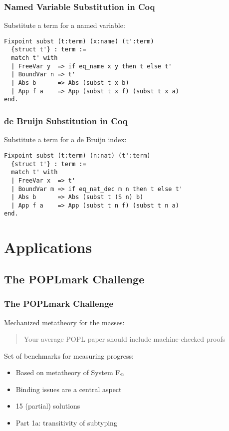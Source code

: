 \documentclass[notheorems]{beamer}
\begin{document}
\begin{frame}[fragile]

  \frametitle{Named Variable Substitution in Coq}

  Substitute a term for a named variable:
  \begin{lstlisting}
Fixpoint subst (t:term) (x:name) (t':term)
  {struct t'} : term :=
  match t' with
  | FreeVar y  => if eq_name x y then t else t'
  | BoundVar n => t'
  | Abs b      => Abs (subst t x b)
  | App f a    => App (subst t x f) (subst t x a)
end.
  \end{lstlisting}

\end{frame}


\begin{frame}[fragile]

  \frametitle{de Bruijn Substitution in Coq}

  Substitute a term for a de Bruijn index:
  \begin{lstlisting}
Fixpoint subst (t:term) (n:nat) (t':term)
  {struct t'} : term :=
  match t' with
  | FreeVar x  => t'
  | BoundVar m => if eq_nat_dec m n then t else t'
  | Abs b      => Abs (subst t (S n) b)
  | App f a    => App (subst t n f) (subst t n a)
end.
  \end{lstlisting}

\end{frame}


\section{Applications}


\subsection{The POPLmark Challenge}




\begin{frame}

  \frametitle{The POPLmark Challenge}

  Mechanized metatheory for the masses:
  \begin{quote}
    Your average POPL paper should include machine-checked proofs
  \end{quote}

  Set of benchmarks for measuring progress:
  \begin{itemize}
    \item Based on metatheory of System F$_\texttt{<\!:}$
    \item Binding issues are a central aspect
    \item 15 (partial) solutions
    \item Part 1a: transitivity of subtyping
  \end{itemize}

\end{frame}
\end{document}
